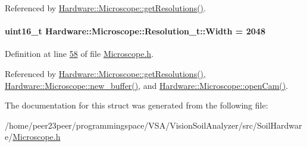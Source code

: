 Referenced by \hyperlink{_microscope_8cpp_source_l00123}{Hardware\+::\+Microscope\+::get\+Resolutions()}.

\hypertarget{struct_hardware_1_1_microscope_1_1_resolution__t_a806e65c6ee59267a6a1c312c61a905dd}{}
\paragraph[{Width}]{\setlength{\rightskip}{0pt plus 5cm}uint16\+\_\+t Hardware\+::\+Microscope\+::\+Resolution\+\_\+t\+::\+Width = 2048}\label{struct_hardware_1_1_microscope_1_1_resolution__t_a806e65c6ee59267a6a1c312c61a905dd}


Definition at line \hyperlink{_microscope_8h_source_l00058}{58} of file \hyperlink{_microscope_8h_source}{Microscope.\+h}.



Referenced by \hyperlink{_microscope_8cpp_source_l00123}{Hardware\+::\+Microscope\+::get\+Resolutions()}, \hyperlink{_microscope_8cpp_source_l00413}{Hardware\+::\+Microscope\+::new\+\_\+buffer()}, and \hyperlink{_microscope_8cpp_source_l00167}{Hardware\+::\+Microscope\+::open\+Cam()}.



The documentation for this struct was generated from the following file\+:\begin{DoxyCompactItemize}
\item 
/home/peer23peer/programmingspace/\+V\+S\+A/\+Vision\+Soil\+Analyzer/src/\+Soil\+Hardware/\hyperlink{_microscope_8h}{Microscope.\+h}\end{DoxyCompactItemize}
